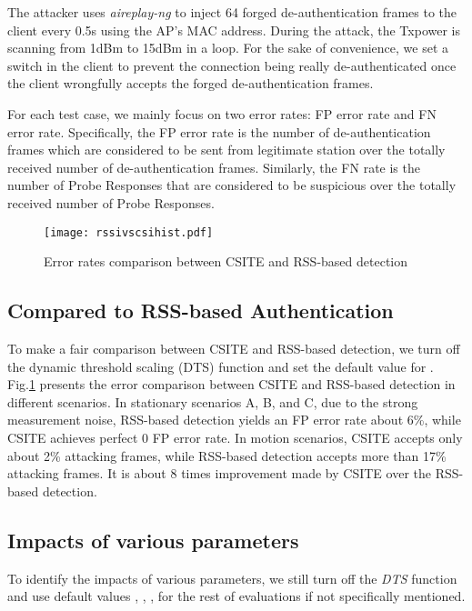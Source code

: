 \documentclass[conference]{IEEEtran}
\begin{document}
The attacker uses \textit{aireplay-ng} to inject 64 forged de-authentication frames to the client every 0.5s using the AP's MAC address. During the attack, the Txpower is scanning from 1dBm to 15dBm in a loop. For the sake of convenience, we set a switch in the client to prevent the connection being really de-authenticated once the client wrongfully accepts the forged de-authentication frames.



For each test case, we mainly focus on two error rates: FP error rate and FN error rate. Specifically, the FP error rate is the number of de-authentication frames which are considered to be sent from legitimate station over the totally received number of de-authentication frames. Similarly, the FN rate is the number of Probe Responses that are considered to be suspicious over the totally received number of Probe Responses.




\begin{figure}[hptb]
\begin{center}
\texttt{[image: rssivscsihist.pdf]}
\end{center}
\caption{Error rates comparison between CSITE and RSS-based detection }
\label{fig:RSSvscsihist}
\vspace{-0.1in}
\end{figure}


\subsection{Compared to RSS-based Authentication}



To make a fair comparison between CSITE and RSS-based detection, we turn off the dynamic threshold scaling (DTS) function and set the default value for . Fig.\ref{fig:RSSvscsihist} presents the error comparison between CSITE and RSS-based detection in different scenarios. In stationary scenarios A, B, and C, due to the strong measurement noise, RSS-based detection yields an FP error rate about 6\%, while  CSITE achieves perfect 0 FP error rate. In motion scenarios, CSITE accepts only about 2\% attacking frames, while RSS-based detection accepts more than 17\% attacking frames. It is about 8 times improvement made by CSITE over the RSS-based detection.


\subsection{Impacts of various parameters}
To identify the impacts of various parameters, we still turn off the \textit{DTS} function and use default values , , ,  for the rest of evaluations if not specifically mentioned.
\end{document}

